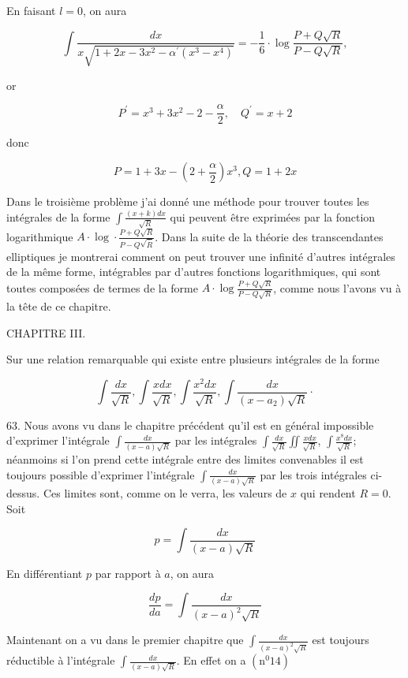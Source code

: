 \documentclass{article}
\begin{document}
En faisant \(l=0\), on aura

\[
\int \frac{d x}{x \sqrt{1+2 x-3 x^{2}-\alpha^{\prime}\left(x^{3}-x^{4}\right)}}=-\frac{1}{6} \cdot \log \frac{P+Q \sqrt{R}}{P-Q \sqrt{R}},
\]

or

\[
P^{\prime}=x^{3}+3 x^{2}-2-\frac{\alpha}{2}, \quad Q^{\prime}=x+2
\]

donc

\[
P=1+3 x-\left(2+\frac{\alpha}{2}\right) x^{3}, Q=1+2 x
\]

Dans le troisième problème j'ai donné une méthode pour trouver toutes les intégrales de la forme \(\int \frac{(x+k) d x}{\sqrt{R}}\) qui peuvent être exprimées par la fonction logarithmique \(A \cdot \log \cdot \frac{P+Q \sqrt{R}}{P-Q \sqrt{\bar{R}}}\). Dans la suite de la théorie des transcendantes elliptiques je montrerai comment on peut trouver une infinité d'autres intégrales de la même forme, intégrables par d'autres fonctions logarithmiques, qui sont toutes composées de termes de la forme \(A \cdot \log \frac{P+Q \sqrt{R}}{P-Q \sqrt{R}}\), comme nous l'avons vu à la tête de ce chapitre.

CHAPITRE III.

Sur une relation remarquable qui existe entre plusieurs intégrales de la forme

\[
\int \frac{d x}{\sqrt{R}}, \int \frac{x d x}{\sqrt{R}}, \int \frac{x^{2} d x}{\sqrt{R}}, \int \frac{d x}{\left(x-a_{2}\right) \sqrt{R}} \cdot
\]

63. Nous avons vu dans le chapitre précédent qu'il est en général impossible d'exprimer l'intégrale \(\int \frac{d x}{(x-a) \sqrt{R}}\) par les intégrales \(\int \frac{d x}{\sqrt{R}} \iint \frac{x d x}{\sqrt{R}}\), \(\int \frac{x^{8} d x}{\sqrt{R}}\); néanmoins si l'on prend cette intégrale entre des limites convenables
il est toujours possible d'exprimer l'intégrale \(\int \frac{d x}{(x-a) \sqrt{R}}\) par les trois intégrales ci-dessus. Ces limites sont, comme on le verra, les valeurs de \(x\) qui rendent \(R=0\). Soit

\[
p=\int \frac{d x}{(x-a) \sqrt{R}}
\]

En différentiant \(p\) par rapport à \(a\), on aura

\[
\frac{d p}{d a}=\int \frac{d x}{(x-a)^{2} \sqrt{R}}
\]

Maintenant on a vu dans le premier chapitre que \(\int \frac{d x}{(x-a)^{2} \sqrt{R}}\) est toujours réductible à l'intégrale \(\int \frac{d x}{(x-a) \sqrt{R}}\). En effet on a \(\left(\mathrm{n}^{0} 14\right)\)
\end{document}
